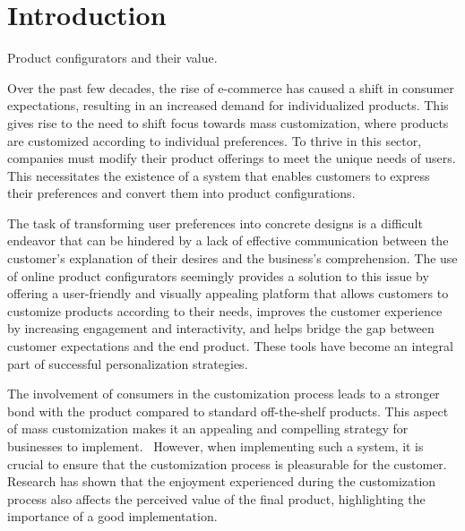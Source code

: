 \chapter*{Introduction}
\setcounter{page}{1}

\begin{chapterabstract}
Product configurators and their value.
\end{chapterabstract}

Over the past few decades, the rise of e-commerce has caused a shift in consumer expectations, resulting in an increased demand for individualized products. This gives rise to the need to shift focus towards mass customization, where products are customized according to individual preferences. To thrive in this sector, companies must modify their product offerings to meet the unique needs of users. This necessitates the existence of a system that enables customers to express their preferences and convert them into product configurations.~\cite{Fulkerson2000}

The task of transforming user preferences into concrete designs is a difficult endeavor that can be hindered by a lack of effective communication between the customer's explanation of their desires and the business's comprehension. The use of online product configurators seemingly provides a solution to this issue by offering a user-friendly and visually appealing platform that allows customers to customize products according to their needs, improves the customer experience by increasing engagement and interactivity, and helps bridge the gap between customer expectations and the end product. These tools have become an integral part of successful personalization strategies.~\cite{Franke2003}

The involvement of consumers in the customization process leads to a stronger bond with the product compared to standard off-the-shelf products. This aspect of mass customization makes it an appealing and compelling strategy for businesses to implement.~\cite{Schreier2006} However, when implementing such a system, it is crucial to ensure that the customization process is pleasurable for the customer. Research has shown that the enjoyment experienced during the customization process also affects the perceived value of the final product, highlighting the importance of a good implementation.~\cite{Franke2010}

